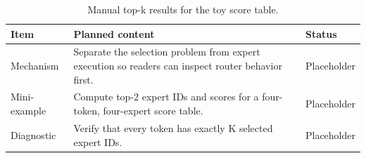 \begin{table}[H]
\centering
\caption{Manual top-k results for the toy score table.}
\label{tab:ch03-top-k-selection-without-dispatch}
\begin{tabularx}{\textwidth}{p{}X p{}}
\toprule
Item & Planned content & Status \\
\midrule
Mechanism & Separate the selection problem from expert execution so readers can inspect router behavior first. & Placeholder \\
Mini-example & Compute top-2 expert IDs and scores for a four-token, four-expert score table. & Placeholder \\
Diagnostic & Verify that every token has exactly K selected expert IDs. & Placeholder \\
\bottomrule
\end{tabularx}
\end{table}
